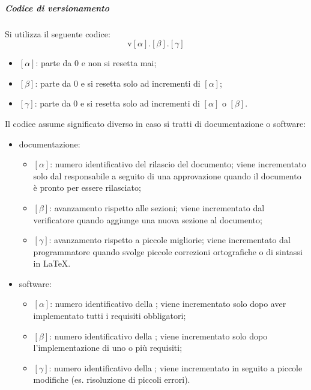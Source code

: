             \subparagraph{Codice di versionamento}
            Si utilizza il seguente codice:
            \[
            \text{v}[\alpha].[\beta].[\gamma]
            \]
            \begin{itemize}
                \item \([\alpha]\): parte da 0 e non si resetta mai;
                \item \([\beta]\): parte da 0 e si resetta solo ad incrementi di \([\alpha]\);
                \item \([\gamma]\): parte da 0 e si resetta solo ad incrementi di \([\alpha]\) o \([\beta]\).
            \end{itemize}
            Il codice assume significato diverso in caso si tratti di documentazione o software:
            \begin{itemize}
                \item documentazione:
                \begin{itemize}
                    \item \([\alpha]\): numero identificativo del rilascio del documento; viene incrementato solo dal responsabile a seguito di una approvazione quando il documento è pronto per essere rilasciato;
                    \item \([\beta]\): avanzamento rispetto alle sezioni; viene incrementato dal verificatore quando aggiunge una nuova sezione al documento;
                    \item \([\gamma]\): avanzamento rispetto a piccole migliorie; viene incrementato dal programmatore quando svolge piccole correzioni ortografiche o di sintassi in \LaTeX.
                \end{itemize}

                \item software:
                \begin{itemize}
                    \item \([\alpha]\): numero identificativo della ; viene incrementato solo dopo aver implementato tutti i requisiti obbligatori;
                    \item \([\beta]\): numero identificativo della ; viene incrementato solo dopo l'implementazione di uno o più requisiti;
                    \item \([\gamma]\): numero identificativo della ; viene incrementato in seguito a piccole modifiche (es. risoluzione di piccoli errori).
                \end{itemize}
            \end{itemize}

